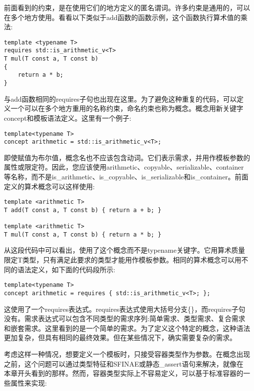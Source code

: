 前面看到的约束，是在使用它们的地方定义的匿名谓词。许多约束是通用的，可以在多个地方使用。看看以下类似于add函数的函数示例，这个函数执行算术值的乘法:

\begin{lstlisting}[style=styleCXX]
template <typename T>
requires std::is_arithmetic_v<T>
T mul(T const a, T const b)
{
	return a * b;
}
\end{lstlisting}

与add函数相同的requires子句也出现在这里。为了避免这种重复的代码，可以定义一个可以在多个地方重用的名称约束，命名约束也称为概念。概念用新关键字concept和模板语法定义。这里有一个例子:

\begin{lstlisting}[style=styleCXX]
template<typename T>
concept arithmetic = std::is_arithmetic_v<T>;
\end{lstlisting}

即使赋值为布尔值，概念名也不应该包含动词。它们表示需求，并用作模板参数的属性或限定符。因此，您应该使用arithmetic、copyable、serializable、container等名称，而不是is\_arithmetic、is\_copyable、is\_serializable和is\_container。前面定义的算术概念可以这样使用:

\begin{lstlisting}[style=styleCXX]
template <arithmetic T>
T add(T const a, T const b) { return a + b; }

template <arithmetic T>
T mul(T const a, T const b) { return a * b; }
\end{lstlisting}

从这段代码中可以看出，使用了这个概念而不是typename关键字。它用算术质量限定T类型，只有满足此要求的类型才能用作模板参数。相同的算术概念可以用不同的语法定义，如下面的代码段所示:

\begin{lstlisting}[style=styleCXX]
template<typename T>
concept arithmetic = requires { std::is_arithmetic_v<T>; };
\end{lstlisting}

这使用了一个requires表达式。requires表达式使用大括号分支\{\}，而requires子句没有。需求表达式可以包含不同类型的需求序列:简单需求、类型需求、复合需求和嵌套需求。这里看到的是一个简单的需求。为了定义这个特定的概念，这种语法更加复杂，但具有相同的最终效果。但在某些情况下，确实需要复杂的需求。

考虑这样一种情况，想要定义一个模板时，只接受容器类型作为参数。在概念出现之前，这个问题可以通过类型特征和SFINAE或静态\_assert语句来解决，就像在本章开头看到的那样。然而，容器类型实际上不容易定义，可以基于标准容器的一些属性来实现:

